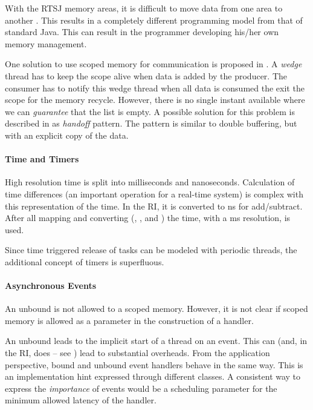 With the RTSJ memory areas, it is difficult to move data from one
area to another \cite{Niessner03}. This results in a completely
different programming model from that of standard Java. This can
result in the programmer developing his/her own memory management.

One solution to use scoped memory for communication is proposed in
\cite{conf/isorc/PizloFHV04}. A \emph{wedge} thread has to keep the
scope alive when data is added by the producer. The consumer has to
notify this wedge thread when all data is consumed the exit the
scope for the memory recycle. However, there is no single instant
available where we can \emph{guarantee} that the list is empty. A
possible solution for this problem is described in
\cite{conf/isorc/PizloFHV04} as \emph{handoff} pattern. The pattern
is similar to double buffering, but with an explicit copy of the
data.


\paragraph{Time and Timers }

High resolution time is split into milliseconds and nanoseconds.
Calculation of time differences (an important operation for a
real-time system) is complex with this representation of the time.
In the RI, it is converted to ns for add/subtract. After all mapping
and converting (, ,
 and ) the
 time, with a ms resolution, is
used.

Since time triggered release of tasks can be modeled with periodic
threads, the additional concept of timers is superfluous.

\paragraph{Asynchronous Events}

An unbound  is not allowed to 
a scoped memory. However, it is not clear if scoped memory is
allowed as a parameter in the construction of a handler.

An unbound  leads to the implicit start of a
thread on an event. This can (and, in the RI, does -- see
\cite{701668}) lead to substantial overheads. From the application
perspective, bound and unbound event handlers behave in the same
way. This is an implementation hint expressed through different
classes. A consistent way to express the \textit{importance} of
events would be a scheduling parameter for the minimum allowed
latency of the handler.

